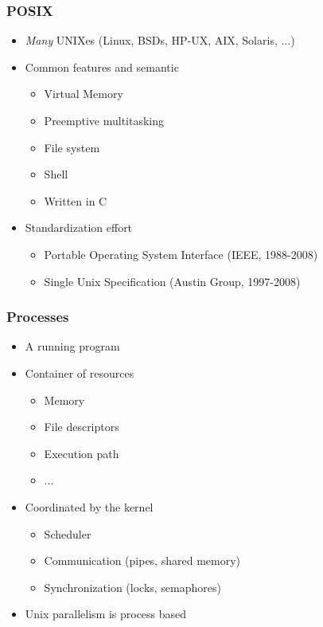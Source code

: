 \begin{frame}
  \frametitle{POSIX}

  \begin{itemize}
  \item \emph{Many} UNIXes (Linux, BSDs, HP-UX, AIX, Solaris, ...)
  \item Common features and semantic
    \begin{itemize}
    \item Virtual Memory
    \item Preemptive multitasking
    \item File system
    \item Shell
    \item Written in C
    \end{itemize}
  \item Standardization effort
    \begin{itemize}
    \item Portable Operating System Interface (IEEE, 1988-2008)
    \item Single Unix Specification (Austin Group, 1997-2008)
    \end{itemize}
  \end{itemize}
\end{frame}


\begin{frame}
  \frametitle{Processes}

  \begin{itemize}
  \item A running program
  \item Container of resources
    \begin{itemize}
    \item Memory
    \item File descriptors
    \item Execution path
    \item ...
    \end{itemize}
  \item Coordinated by the kernel
    \begin{itemize}
    \item Scheduler
    \item Communication (pipes, shared memory)
    \item Synchronization (locks, semaphores)
    \end{itemize}
  \item Unix parallelism is process based
  \end{itemize}
\end{frame}


